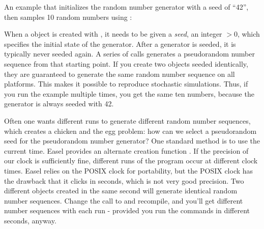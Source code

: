 An example that initializes the random number generator with a seed of
``42'', then samples 10 random numbers using :



When a  object is created with
, it needs to be given a \emph{seed},
an integer $> 0$, which specifies the initial state of the
generator. After a generator is seeded, it is typically never seeded
again. A series of  calls generates a
pseudorandom number sequence from that starting point. If you create
two  objects seeded identically, they are
guaranteed to generate the same random number sequence on all
platforms. This makes it possible to reproduce stochastic simulations.
Thus, if you run the example multiple times, you get the same ten
numbers, because the generator is always seeded with 42.

Often one wants different runs to generate different random number
sequences, which creates a chicken and the egg problem: how can we
select a pseudorandom seed for the pseudorandom number generator? One
standard method is to use the current time. Easel provides an
alternate creation function
. If the precision of our
clock is sufficiently fine, different runs of the program occur at
different clock times. Easel relies on the POSIX clock for
portability, but the POSIX clock has the drawback that it clicks in
seconds, which is not very good precision. Two different
 objects created in the same second will
generate identical random number sequences. Change the
 call to
 and recompile, and you'll
get different number sequences with each run - provided you run the
commands in different seconds, anyway.





